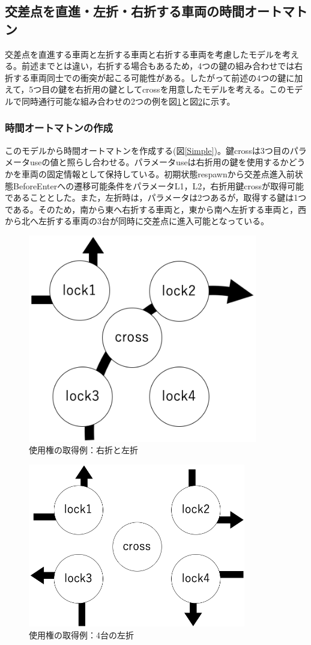 \documentclass{tpu-sotu}
\begin{document}
	\subsection{交差点を直進・左折・右折する車両の時間オートマトン}
	交差点を直進する車両と左折する車両と右折する車両を考慮したモデルを考える。前述までとは違い，右折する場合もあるため，4つの鍵の組み合わせでは右折する車両同士での衝突が起こる可能性がある。したがって前述の4つの鍵に加えて，5つ目の鍵を右折用の鍵としてcrossを用意したモデルを考える。このモデルで同時通行可能な組み合わせの2つの例を図\ref{RL}と図\ref{4L}に示す。
	\subsubsection{時間オートマトンの作成}
	このモデルから時間オートマトンを作成する(図\ref{Simple})。鍵crossは3つ目のパラメータuseの値と照らし合わせる。パラメータuseは右折用の鍵を使用するかどうかを車両の固定情報として保持している。初期状態respawnから交差点進入前状態BeforeEnterへの遷移可能条件をパラメータL1，L2，右折用鍵crossが取得可能であることとした。また，左折時は，パラメータは2つあるが，取得する鍵は1つである。そのため，南から東へ右折する車両と，東から南へ左折する車両と，西から北へ左折する車両の3台が同時に交差点に進入可能となっている。
	\begin{figure}[htbp]
	\centering
	\includegraphics[width=100mm]{wn-se.png}
	\caption{使用権の取得例：右折と左折}
	\label{RL}
	\end{figure}
	\begin{figure}[htbp]
	\centering
	\includegraphics[width=95mm]{leftcouse.png}
	\caption{使用権の取得例：4台の左折}
	\label{4L}
	\end{figure}
\end{document}
